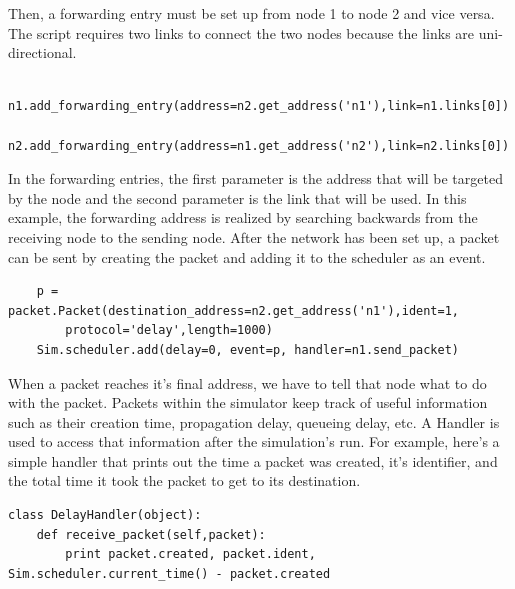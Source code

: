 \documentclass[11pt]{article}
\begin{document}
Then, a forwarding entry must be set up from node 1 to node 2 and vice versa. The script requires two links to connect the two nodes because the links are uni-directional.

\vspace{5mm}

\begin{lstlisting}
    n1.add_forwarding_entry(address=n2.get_address('n1'),link=n1.links[0])
    n2.add_forwarding_entry(address=n1.get_address('n2'),link=n2.links[0])
\end{lstlisting}

\vspace{5mm}

In the forwarding entries, the first parameter is the address that will be targeted by the node and the second parameter is the link that will be used. In this example, the forwarding address is realized by searching backwards from the receiving node to the sending node.
After the network has been set up, a packet can be sent by creating the packet and adding it to the scheduler as an event.

\vspace{5mm}

\begin{lstlisting}
    p = packet.Packet(destination_address=n2.get_address('n1'),ident=1,
        protocol='delay',length=1000)
    Sim.scheduler.add(delay=0, event=p, handler=n1.send_packet)
\end{lstlisting}

\vspace{5mm}

When a packet reaches it's final address, we have to tell that node what to do with the packet. Packets within the simulator keep track of useful information such as their creation time, propagation delay, queueing delay, etc. A Handler is used to access that information after the simulation's run. For example, here's a simple handler that prints out the time a packet was created, it's identifier, and the total time it took the packet to get to its destination.

\vspace{5mm}

\begin{lstlisting}
class DelayHandler(object):
    def receive_packet(self,packet):
        print packet.created, packet.ident, Sim.scheduler.current_time() - packet.created
\end{lstlisting}

\vspace{5mm}
\end{document}
